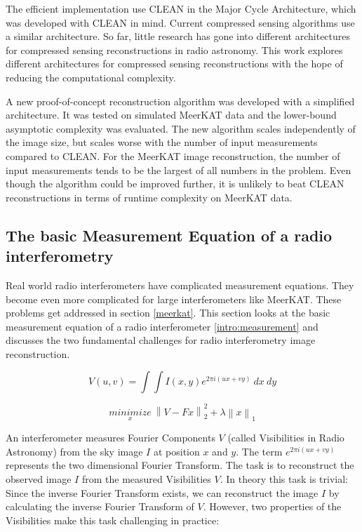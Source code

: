 The efficient implementation use CLEAN in the Major Cycle Architecture, which was developed with CLEAN in mind. Current compressed sensing algorithms use a similar architecture. So far, little research has gone into different architectures for compressed sensing reconstructions in radio astronomy. This work explores different architectures for compressed sensing reconstructions with the hope of reducing the computational complexity. 

A new proof-of-concept reconstruction algorithm was developed with a simplified architecture. It was tested on simulated MeerKAT data and the lower-bound asymptotic complexity was evaluated. The new algorithm scales independently of the image size, but scales worse with the number of input measurements compared to CLEAN. For the MeerKAT image reconstruction, the number of input measurements tends to be the largest of all numbers in the problem. Even though the algorithm could be improved further, it is unlikely to beat CLEAN reconstructions in terms of runtime complexity on MeerKAT data.


\subsection{The basic Measurement Equation of a radio interferometry}\label{intro:basic}
Real world radio interferometers have complicated measurement equations. They become even more complicated for large interferometers like MeerKAT. These problems get addressed in section \ref{meerkat}. This section looks at the basic measurement equation of a radio interferometer \eqref{intro:measurement} and discusses the two fundamental challenges for radio interferometry image reconstruction. 

\begin{equation}\label{intro:measurement}
V(u, v) = \int\int I(x, y) e^{2 \pi i (ux+vy)} \: dx \: dy
\end{equation}

\begin{equation}\label{intro:cs}
\underset{x}{minimize} \: \left \| V - Fx \right \|_2^2 + \lambda \left \| x \right \|_1
\end{equation}



An interferometer measures Fourier Components $V$ (called Visibilities in Radio Astronomy) from the sky image $I$ at position $x$ and $y$. The term $e^{2 \pi i (ux+vy)}$ represents the two dimensional Fourier Transform. The task is to reconstruct the observed image $I$ from the measured Visibilities $V$. In theory this task is trivial: Since the inverse Fourier Transform exists, we can reconstruct the image $I$ by calculating the inverse Fourier Transform of $V$. However, two properties of the Visibilities make this task challenging in practice:

